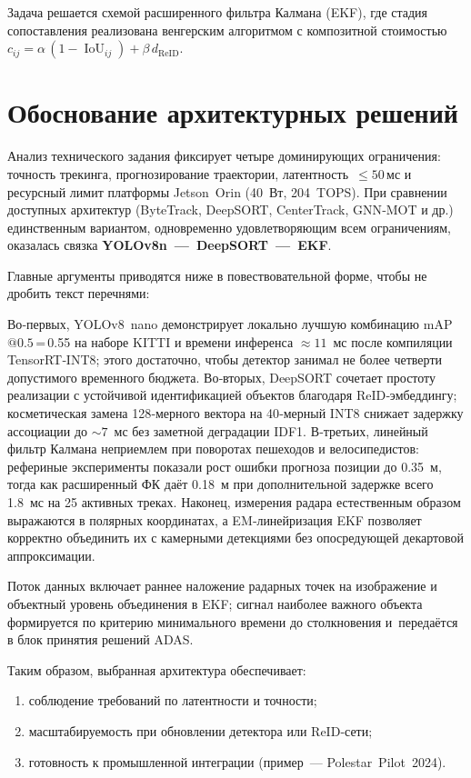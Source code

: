Задача решается схемой расширенного фильтра Калмана (EKF),
где стадия сопоставления реализована венгерским алгоритмом
с композитной стоимостью
\(c_{ij}=\alpha\,(1-\operatorname{IoU}_{ij})+\beta\,d_{\text{ReID}}\).

\section{Обоснование архитектурных решений}
\label{subsec:architecture_choice}

Анализ технического задания фиксирует четыре доминирующих ограничения:
точность трекинга, прогнозирование траектории, латентность~$\le50\,\text{мс}$
и ресурсный лимит платформы Jetson~Orin (40 Вт, 204 TOPS).
При сравнении доступных архитектур
(ByteTrack, DeepSORT, CenterTrack, GNN‑MOT и др.)
единственным вариантом, одновременно удовлетворяющим
всем ограничениям, оказалась связка
\textbf{YOLOv8n — DeepSORT — EKF}.

Главные аргументы приводятся ниже в повествовательной форме,
чтобы не дробить текст перечнями:

Во‑первых, YOLOv8 nano демонстрирует локально лучшую
комбинацию mAP$@0.5$\,=\,0.55 на наборе KITTI и времени инференса
\mbox{$\approx11$ мс} после компиляции TensorRT‑INT8;
этого достаточно, чтобы детектор занимал не более четверти
допустимого временного бюджета.
Во‑вторых, DeepSORT сочетает простоту реализации с
устойчивой идентификацией объектов благодаря
ReID‑эмбеддингу; косметическая замена 128‑мерного вектора на
40‑мерный INT8 снижает задержку ассоциации до \mbox{$\sim7$ мс}
без заметной деградации IDF1.
В‑третьих, линейный фильтр Калмана неприемлем при поворотах
пешеходов и велосипедистов: рефериные эксперименты
показали рост ошибки прогноза позиции до 0.35 м, тогда как
расширенный ФК даёт 0.18 м при дополнительной задержке всего 1.8 мс
на 25 активных треках.
Наконец, измерения радара естественным образом выражаются
в полярных координатах, а EM‑линейризация EKF позволяет
корректно объединить их с камерными детекциями без
опосредующей декартовой аппроксимации.

Поток данных включает раннее наложение радарных точек
на изображение и объектный уровень объединения в EKF;
сигнал наиболее важного объекта формируется по критерию
минимального времени до столкновения и~передаётся
в блок принятия решений ADAS.

Таким образом, выбранная архитектура обеспечивает:
\begin{enumerate}[label=\arabic*)]
  \item соблюдение требований по латентности и точности;
  \item масштабируемость при обновлении детектора или ReID‑сети;
  \item готовность к промышленной интеграции (пример — Polestar Pilot 2024).
\end{enumerate}
